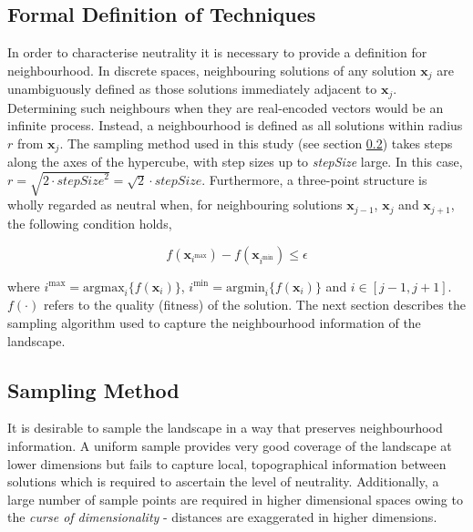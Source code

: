 \documentclass[conference]{IEEEtran}
\renewcommand{\vec}[1]{\mathbf{#1}}
\begin{document}
\subsection{Formal Definition of Techniques}
\label{neutralityMeasures}
In order to characterise neutrality it is necessary to provide a definition for neighbourhood. In discrete spaces, neighbouring solutions of any solution $\vec{x}_j$ are unambiguously defined as those solutions immediately adjacent to $\vec{x}_j$. Determining such neighbours when they are real-encoded vectors would be an infinite process. Instead, a neighbourhood is defined as all solutions within radius $r$ from $\vec{x}_j$. The sampling method used in this study (see section \ref{sampling}) takes steps along the axes of the hypercube, with step sizes up to \textit{stepSize} large. In this case, $r = \sqrt{2 \cdot {\textit{stepSize}}^2}= \sqrt{2} \cdot \textit{stepSize}$. Furthermore, a three-point structure is wholly regarded as neutral when, for neighbouring solutions $\vec{x}_{j-1}$, $\vec{x}_j$ and $\vec{x}_{j+1}$, the following condition holds,

\begin{equation}
\label{eqNeutralityDef}
	f(\vec{x}_{i^{\text{max}}}) - f(\vec{x}_{i^{\text{min}}}) \le \epsilon			 
\end{equation}

where $i^{\text{max}} = \text{argmax}_i\{f(\vec{x}_i)\}$, $i^{\text{min}} = \text{argmin}_i\{f(\vec{x}_i)\}$ and $i \in [j-1,j+1]$. $f(\cdot)$ refers to the quality (fitness) of the solution. The next section describes the sampling algorithm used to capture the neighbourhood information of the landscape.

\subsection{Sampling Method}
\label{sampling}
It is desirable to sample the landscape in a way that preserves neighbourhood information. A uniform sample provides very good coverage of the landscape at lower dimensions but fails to capture local, topographical information between solutions which is required to ascertain the level of neutrality. Additionally, a large number of sample points are required in higher dimensional spaces owing to the \textit{curse of dimensionality} - distances are exaggerated in higher dimensions. 
\end{document}
